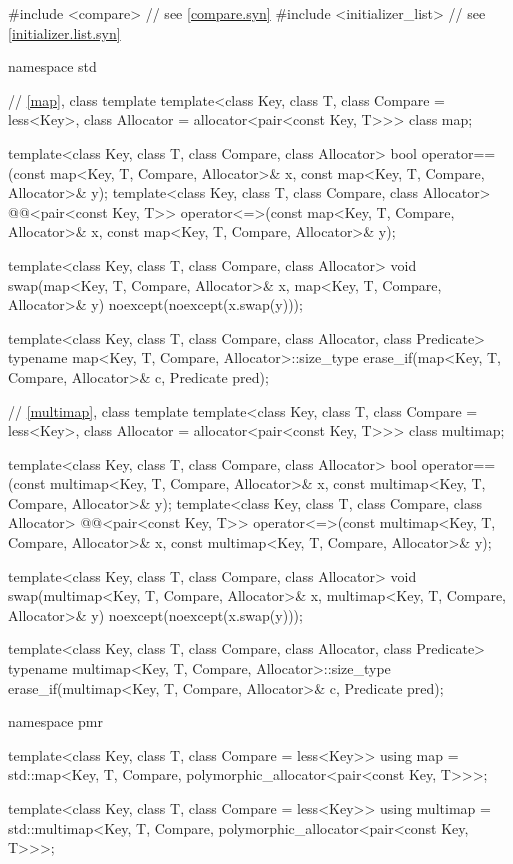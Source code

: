 %
\begin{codeblock}
#include <compare>              // see \ref{compare.syn}
#include <initializer_list>     // see \ref{initializer.list.syn}

namespace std {
  // \ref{map}, class template 
  template<class Key, class T, class Compare = less<Key>,
           class Allocator = allocator<pair<const Key, T>>>
    class map;

  template<class Key, class T, class Compare, class Allocator>
    bool operator==(const map<Key, T, Compare, Allocator>& x,
                    const map<Key, T, Compare, Allocator>& y);
  template<class Key, class T, class Compare, class Allocator>
    @@<pair<const Key, T>>
      operator<=>(const map<Key, T, Compare, Allocator>& x,
                  const map<Key, T, Compare, Allocator>& y);

  template<class Key, class T, class Compare, class Allocator>
    void swap(map<Key, T, Compare, Allocator>& x,
              map<Key, T, Compare, Allocator>& y)
      noexcept(noexcept(x.swap(y)));

  template<class Key, class T, class Compare, class Allocator, class Predicate>
    typename map<Key, T, Compare, Allocator>::size_type
      erase_if(map<Key, T, Compare, Allocator>& c, Predicate pred);

  // \ref{multimap}, class template 
  template<class Key, class T, class Compare = less<Key>,
           class Allocator = allocator<pair<const Key, T>>>
    class multimap;

  template<class Key, class T, class Compare, class Allocator>
    bool operator==(const multimap<Key, T, Compare, Allocator>& x,
                    const multimap<Key, T, Compare, Allocator>& y);
  template<class Key, class T, class Compare, class Allocator>
    @@<pair<const Key, T>>
      operator<=>(const multimap<Key, T, Compare, Allocator>& x,
                  const multimap<Key, T, Compare, Allocator>& y);

  template<class Key, class T, class Compare, class Allocator>
    void swap(multimap<Key, T, Compare, Allocator>& x,
              multimap<Key, T, Compare, Allocator>& y)
      noexcept(noexcept(x.swap(y)));

  template<class Key, class T, class Compare, class Allocator, class Predicate>
    typename multimap<Key, T, Compare, Allocator>::size_type
      erase_if(multimap<Key, T, Compare, Allocator>& c, Predicate pred);

  namespace pmr {
    template<class Key, class T, class Compare = less<Key>>
      using map = std::map<Key, T, Compare,
                           polymorphic_allocator<pair<const Key, T>>>;

    template<class Key, class T, class Compare = less<Key>>
      using multimap = std::multimap<Key, T, Compare,
                                     polymorphic_allocator<pair<const Key, T>>>;
  }
}
\end{codeblock}

